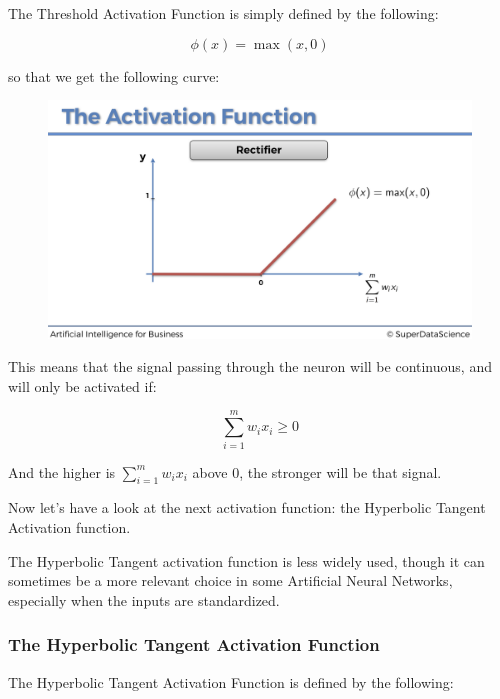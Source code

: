 \documentclass[]{book}
\begin{document}
The Threshold Activation Function is simply defined by the following:

\begin{equation*}
    \phi(x) = \max(x,0)
\end{equation*}

so that we get the following curve:

\begin{figure}[!htbp]
        \begin{center}
            \includegraphics[scale=0.18]{ANN_12.png}
        \end{center}
\end{figure}

This means that the signal passing through the neuron will be continuous, and will only be activated if:

\begin{equation*}
    \sum_{i=1}^m w_i x_i \ge 0
\end{equation*}

And the higher is \(\sum_{i=1}^m w_i x_i\) above 0, the stronger will be that signal.

Now let's have a look at the next activation function: the Hyperbolic Tangent Activation function.

The Hyperbolic Tangent activation function is less widely used, though it can sometimes be a more relevant choice in some Artificial Neural Networks, especially when the inputs are standardized.

\newpage

\subsubsection{The Hyperbolic Tangent Activation Function}

The Hyperbolic Tangent Activation Function is defined by the following:
\end{document}
